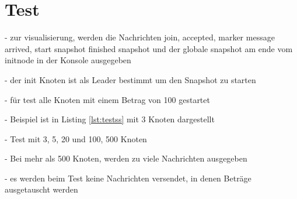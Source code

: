 \section{Test}
\label{sec:test}

- zur visualisierung, werden die Nachrichten join, accepted, marker message 
 arrived, start snapshot finished snapshot und der globale snapshot am ende
  vom initnode in der Konsole ausgegeben
  
- der init Knoten ist als Leader bestimmt um den Snapshot zu starten
  
- für test alle Knoten mit einem Betrag von 100 gestartet

- Beispiel ist in Listing \ref{lst:testss} mit 3 Knoten dargestellt

- Test mit 3, 5, 20 und 100, 500 Knoten

- Bei mehr als 500 Knoten, werden zu viele Nachrichten ausgegeben

- es werden beim Test keine Nachrichten versendet, in denen Beträge 
  ausgetauscht werden